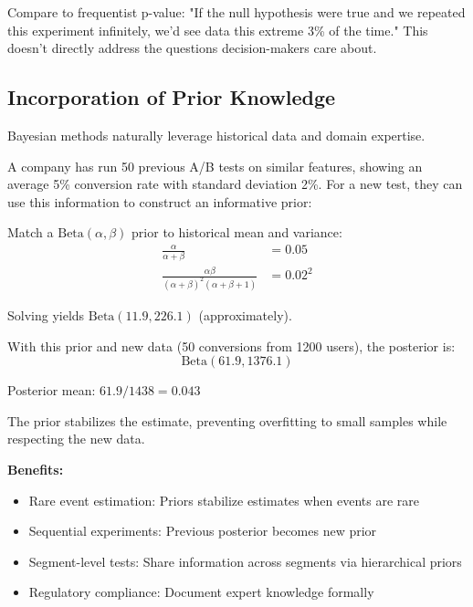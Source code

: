 Compare to frequentist p-value: "If the null hypothesis were true and we repeated this experiment infinitely, we'd see data this extreme 3\% of the time." This doesn't directly address the questions decision-makers care about.

\subsection{Incorporation of Prior Knowledge}

Bayesian methods naturally leverage historical data and domain expertise.

\begin{example}
A company has run 50 previous A/B tests on similar features, showing an average 5\% conversion rate with standard deviation 2\%. For a new test, they can use this information to construct an informative prior:

Match a $\text{Beta}(\alpha, \beta)$ prior to historical mean and variance:
\begin{align}
\frac{\alpha}{\alpha + \beta} &= 0.05 \\
\frac{\alpha\beta}{(\alpha+\beta)^2(\alpha+\beta+1)} &= 0.02^2
\end{align}

Solving yields $\text{Beta}(11.9, 226.1)$ (approximately).

With this prior and new data (50 conversions from 1200 users), the posterior is:
\begin{equation}
\text{Beta}(61.9, 1376.1)
\end{equation}

Posterior mean: $61.9 / 1438 = 0.043$

The prior stabilizes the estimate, preventing overfitting to small samples while respecting the new data.
\end{example}

\textbf{Benefits:}
\begin{itemize}
    \item Rare event estimation: Priors stabilize estimates when events are rare
    \item Sequential experiments: Previous posterior becomes new prior
    \item Segment-level tests: Share information across segments via hierarchical priors
    \item Regulatory compliance: Document expert knowledge formally
\end{itemize}


